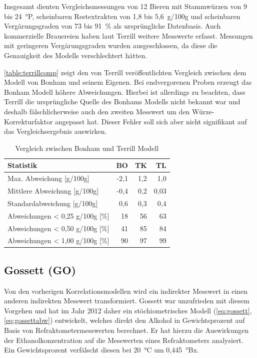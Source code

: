 \documentclass[a4paper,parskip=half]{scrartcl}
\begin{document}
Insgesamt dienten Vergleichsmessungen von 12 Bieren mit Stammwürzen
von 9 bis 24~°P, scheinbaren Restextrakten von 1,8 bis
5,6~g/100g und scheinbaren Vergärungsgraden von 73 bis 91~\%
als ursprüngliche Datenbasis. Auch kommerzielle Brauereien haben
laut Terrill weitere Messwerte erfasst. Messungen mit geringeren
Vergärungsgraden wurden ausgeschlossen, da diese die Genauigkeit des
Modells verschlechtert hätten.
\autocite{Terrill2010a,Terrill2011,Terrill2010,Terrill2013}

\autoref{table:terrillcomp} zeigt den von Terrill veröffentlichten
Vergleich zwischen dem Modell von Bonham und seinem Eigenen. Bei
endvergorenen Proben erzeugt das Bonham Modell höhere
Abweichungen. Hierbei ist allerdings zu beachten, dass
Terrill die ursprüngliche Quelle des Bonhams Modells nicht bekannt war
und deshalb fälschlicherweise auch den zweiten Messwert um
den Würze-Korrekturfaktor angepasst hat. Dieser Fehler soll sich
aber nicht signifikant auf das Vergleichsergebnis auswirken.
\autocite{Terrill2010a,Terrill2011,Terrill2010}

\begin{table}[h]
\centering
\begin{tabular}{lrrr}
\toprule
Statistik & BO & TK & TL \\
\midrule
Max. Abweichung [g/100g] & -2,1 & 1,2 & 1,0 \\
Mittlere Abweichung [g/100g] & -0,4 & 0,2 & 0,03 \\
Standardabweichung [g/100g] & 0,6 & 0,3 & 0,4 \\
Abweichungen < 0,25 g/100g [\%] & 18 & 56 & 63 \\
Abweichungen < 0,50 g/100g [\%] & 41 & 85 & 84 \\
Abweichungen < 1,00 g/100g [\%] & 90 & 97 & 99 \\
\bottomrule
\end{tabular}
\caption{Vergleich zwischen Bonham und Terrill Modell}
\label{table:terrillcomp}
\end{table}

\subsection*{Gossett (GO)}

Von den vorherigen Korrelationsmodellen wird ein indirekter
Messwert in einen anderen indirekten Messwert transformiert. Gossett
war unzufrieden mit diesem Vorgehen und hat im Jahr 2012 daher ein
stöchiometrisches Modell (\autoref{eq:gossett}, \autoref{eq:gossettabw})
entwickelt, welches direkt den Alkohol in Gewichtsprozent auf Basis
von Refraktometermesswerten berechnet. Er hat hierzu die Auswirkungen
der Ethanolkonzentration
auf die Messwerten eines Refraktometers analysiert. Ein Gewichtsprozent
verfälscht diesen bei 20~°C um 0,445~°Bx. 
\autocite{Gossett2012,Gossett2012a,Gossett2012b}
\end{document}
